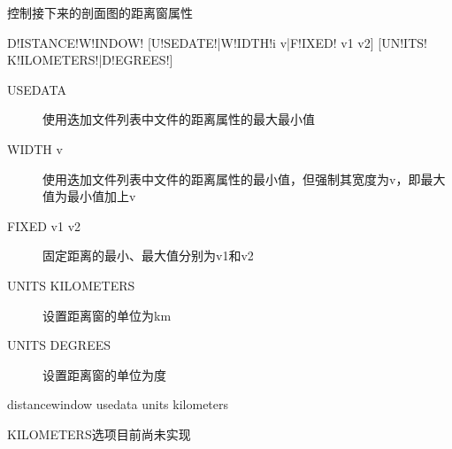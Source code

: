 \label{sss:distancewindow}

控制接下来的剖面图的距离窗属性

\begin{SACSTX}
    D!ISTANCE!W!INDOW! [U!SEDATE!|W!IDTH!i v|F!IXED! v1 v2]
        [UN!ITS! K!ILOMETERS!|D!EGREES!]
\end{SACSTX}

\begin{description}
\item [USEDATA] 使用迭加文件列表中文件的距离属性的最大最小值
\item [WIDTH v] 使用迭加文件列表中文件的距离属性的最小值，但强制其宽度为v，即最大值为最小值加上v
\item [FIXED v1 v2] 固定距离的最小、最大值分别为v1和v2
\item [UNITS KILOMETERS] 设置距离窗的单位为km
\item [UNITS DEGREES] 设置距离窗的单位为度
\end{description}

\begin{SACDFT}
distancewindow usedata units kilometers
\end{SACDFT}

KILOMETERS选项目前尚未实现

